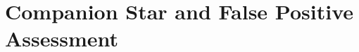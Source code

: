\documentclass[12pt,modern,twocolumn,tighten]{aastex63}
\begin{document}
%  
%  





\section{Companion Star and False Positive Assessment}
\label{app:companionstar}
\end{document}
